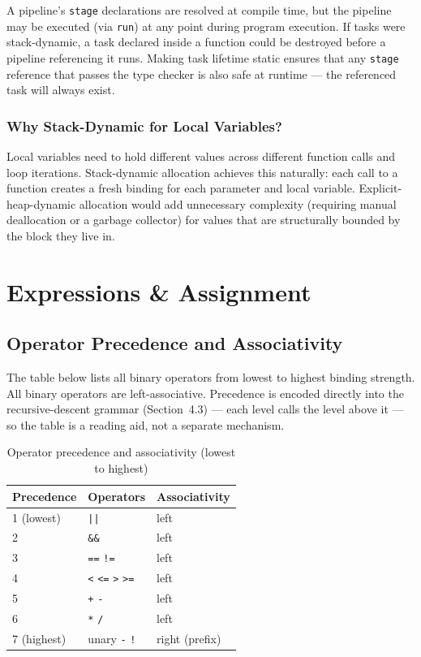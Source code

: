 \documentclass[10pt,a4paper]{article}
\begin{document}
A pipeline's \texttt{stage} declarations are resolved at compile time,
but the pipeline may be executed (via \texttt{run}) at any point during
program execution. If tasks were stack-dynamic, a task declared inside a
function could be destroyed before a pipeline referencing it runs. Making
task lifetime static ensures that any \texttt{stage} reference that
passes the type checker is also safe at runtime --- the referenced task
will always exist.

\subsubsection{Why Stack-Dynamic for Local Variables?}

Local variables need to hold different values across different function
calls and loop iterations. Stack-dynamic allocation achieves this
naturally: each call to a function creates a fresh binding for each
parameter and local variable. Explicit-heap-dynamic allocation would add
unnecessary complexity (requiring manual deallocation or a garbage
collector) for values that are structurally bounded by the block they
live in.

\section{Expressions \& Assignment}

\subsection{Operator Precedence and Associativity}

The table below lists all binary operators from lowest to highest binding strength. All
binary operators are left-associative. Precedence is encoded directly into the
recursive-descent grammar (Section~4.3) --- each level calls the level above it --- so the
table is a reading aid, not a separate mechanism.

\begin{table}[h!]
\centering
\begin{tabular}{@{}lll@{}}
\toprule
\textbf{Precedence} & \textbf{Operators} & \textbf{Associativity} \\
\midrule
1 (lowest) & \texttt{||} & left \\
2          & \texttt{\&\&} & left \\
3          & \texttt{==} \quad \texttt{!=} & left \\
4          & \texttt{<} \quad \texttt{<=} \quad \texttt{>} \quad \texttt{>=} & left \\
5          & \texttt{+} \quad \texttt{-} & left \\
6          & \texttt{*} \quad \texttt{/} & left \\
7 (highest) & unary \texttt{-} \quad \texttt{!} & right (prefix) \\
\bottomrule
\end{tabular}
\caption{Operator precedence and associativity (lowest to highest)}
\end{table}
\end{document}
